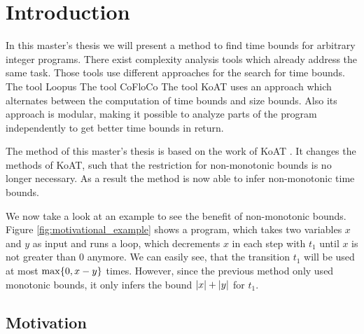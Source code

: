 \section{Introduction}

In this master's thesis we will present a method to find time bounds for arbitrary integer programs.
There exist complexity analysis tools which already address the same task.
Those tools use different approaches for the search for time bounds.
The tool Loopus \cite{loopus1} \cite{loopus2} 
The tool CoFloCo \cite{cofloco1} \cite{cofloco2} \cite{cofloco3} \cite{cofloco4} 
The tool KoAT \cite{koat} uses an approach which alternates between the computation of time bounds and size bounds.
Also its approach is modular, making it possible to analyze parts of the program independently to get better time bounds in return.

The method of this master's thesis is based on the work of KoAT \cite{koat}.
It changes the methods of KoAT, such that the restriction for non-monotonic bounds is no longer necessary.
As a result the method is now able to infer non-monotonic time bounds.

We now take a look at an example to see the benefit of non-monotonic bounds.
Figure \ref{fig:motivational_example} shows a program, which takes two variables $x$ and $y$ as input and runs a loop, which decrements $x$ in each step with $t_1$ until $x$ is not greater than 0 anymore.
We can easily see, that the transition $t_1$ will be used at most $\max \lbrace 0, x-y \rbrace$ times.
However, since the previous method only used monotonic bounds, it only infers the bound $\left|x\right|+\left|y\right|$ for $t_1$.


\subsection{Motivation}




